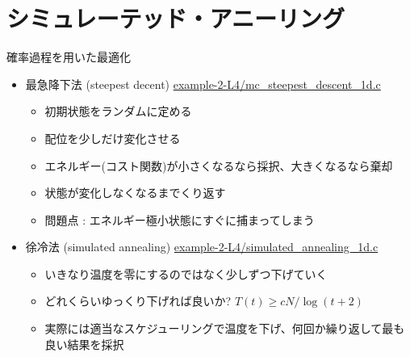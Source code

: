 \section{シミュレーテッド・アニーリング}

\begin{frame}[t,fragile]{確率過程を用いた最適化}
  \begin{itemize}
    \setlength{\itemsep}{1em}
  \item 最急降下法 (steepest decent) {\footnotesize \href{https://github.com/todo-group/computer-experiments/blob/master/exercise/optimization/mc_steepest_descent_1d.c}{example-2-L4/mc\_steepest\_descent\_1d.c}}
    \begin{itemize}
    \item 初期状態をランダムに定める
    \item 配位を少しだけ変化させる
    \item エネルギー(コスト関数)が小さくなるなら採択、大きくなるなら棄却
    \item 状態が変化しなくなるまでくり返す %
    \item 問題点 : エネルギー極小状態にすぐに捕まってしまう
    \end{itemize}
  \item 徐冷法 (simulated annealing) {\footnotesize \href{https://github.com/todo-group/computer-experiments/blob/master/exercise/optimization/simulated_annealing_1d.c}{example-2-L4/simulated\_annealing\_1d.c}}
    \begin{itemize}
    \item いきなり温度を零にするのではなく少しずつ下げていく
    \item どれくらいゆっくり下げれば良いか? $
      T(t) \ge cN / \log(t+2)
      $
    \item 実際には適当なスケジューリングで温度を下げ、何回か繰り返して最も良い結果を採択
    \end{itemize}
  \end{itemize}
\end{frame}

